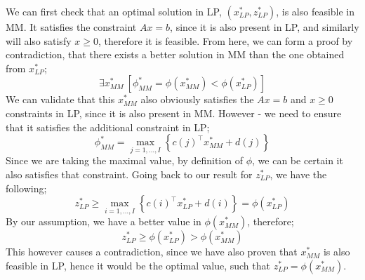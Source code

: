 \documentclass[a4paper, 12pt]{article}
\begin{document}
                We can first check that an optimal solution in LP, $(x^*_{LP}, z^*_{LP})$, is also feasible in MM.
                It satisfies the constraint $Ax = b$, since it is also present in LP, and similarly will also satisfy $x \geq 0$, therefore it is feasible.
                From here, we can form a proof by contradiction, that there exists a better solution in MM than the one obtained from $x^*_{LP}$;
                $$\exists x^*_{MM}\ \left[\phi^*_{MM} = \phi(x^*_{MM}) < \phi(x^*_{LP})\right]$$
                We can validate that this $x^*_{MM}$ also obviously satisfies the $Ax = b$ and $x \geq 0$ constraints in LP, since it is also present in MM.
                However - we need to ensure that it satisfies the additional constraint in LP;
                $$\phi^*_{MM} = \max_{j = 1, \dots, I} \left\{ c(j)^\top x^*_{MM} + d(j) \right\}$$
                Since we are taking the maximal value, by definition of $\phi$, we can be certain it also satisfies that constraint.
                Going back to our result for $z^*_{LP}$, we have the following;
                $$z^*_{LP} \geq \max_{i = 1, \dots, I} \left\{ c(i)^\top x^*_{LP} + d(i) \right\} = \phi(x^*_{LP})$$
                By our assumption, we have a better value in $\phi(x^*_{MM})$, therefore;
                $$z^*_{LP} \geq \phi(x^*_{LP}) > \phi(x^*_{MM})$$
                This however causes a contradiction, since we have also proven that $x^*_{MM}$ is also feasible in LP, hence it would be the optimal value, such that $z^*_{LP} = \phi(x^*_{MM})$.
\end{document}
